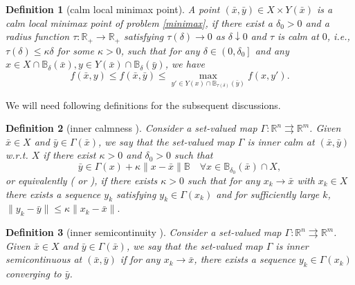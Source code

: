 \documentclass[11pt]{article}
\numberwithin{equation}{section}
\newtheorem{definition}{Definition}[section]
\begin{document}
{\begin{definition}[calm local minimax point]\label{calmmm}
A point $(\bar{x}, \bar{y}) \in X \times  Y(\bar x)$ is a calm local minimax point of problem \eqref{minimax}, if there exist a $\delta_0>0$ and a radius function $\tau: \mathbb{R}_{+} \rightarrow \mathbb{R}_{+}$ satisfying $\tau(\delta) \rightarrow 0$ as $\delta \downarrow 0$ and $\tau$ is calm at $0$, i.e., $\tau(\delta) \leq \kappa \delta$ for some $\kappa>0$, such that for any $\delta \in\left(0, \delta_0\right]$ and any $x\in X\cap \mathbb{B}_\delta(\bar x), y\in Y(\bar x)\cap \mathbb{B}_\delta(\bar y)$, we have
\begin{equation*}\label{localmm1}
f(\bar{x}, y) \leq f(\bar{x}, \bar{y}) \leq \max_{y' \in  Y(x)\cap\mathbb{B}_{\tau( \delta)}(\bar y)} f (x, y' ).
\end{equation*}
\end{definition}



We will need following definitions for the subsequent discussions.

\begin{definition}[inner calmness ]\label{innercalm}
	Consider  a set-valued map $\Gamma: \mathbb{R}^n \rightrightarrows \mathbb{R}^m$.
	Given $\bar x\in X$ and $\bar y \in  \Gamma(\bar x)$, we say that the set-valued map $\Gamma$ is inner calm at $(\bar{x}, \bar{y})$ w.r.t. $X$ if there exist $\kappa >0$ and  $\delta_0>0$  such that
	$$\bar y \in \Gamma(x)+\kappa \|x-\bar x\| \mathbb{B} \quad \forall x\in \mathbb{B}_{\delta_0}(\bar x) \cap X,$$
	or equivalently (\cite[Lemma 2.2]{BGO19} or \cite[Definition 2.2]{Benko-2021}), if there exists $\kappa >0$ such that for any $x_k \rightarrow \bar x$ with $x_k \in X$ there exists a sequence $y_k$ satisfying $y_k \in \Gamma (x_k )$ and for sufficiently large $k$,
	$\|y_k-\bar y\| \leq \kappa \|x_k-\bar x\|.$
\end{definition}

{
\begin{definition}[inner semicontinuity ]
Consider  a set-valued map $\Gamma: \mathbb{R}^n \rightrightarrows \mathbb{R}^m$. Given $\bar x\in X$ and $\bar y \in  \Gamma(\bar x)$, we say that the set-valued map $\Gamma$ is inner semicontinuous at $(\bar{x}, \bar{y})$ if for any $x_k \rightarrow \bar x$, there exists a sequence $y_k \in \Gamma\left(x_k\right)$ converging to $\bar y$.
\end{definition}
}

}
\end{document}
